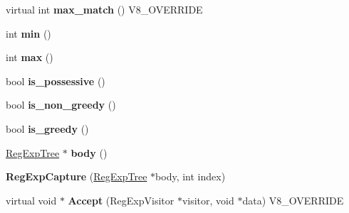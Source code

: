 \begin{DoxyCompactItemize}
\item 
\hypertarget{classv8_1_1internal_1_1_v8___f_i_n_a_l_a0b9dd74bfd4f1172c26a072c44da8669}{}virtual int {\bfseries max\+\_\+match} () V8\+\_\+\+O\+V\+E\+R\+R\+I\+D\+E\label{classv8_1_1internal_1_1_v8___f_i_n_a_l_a0b9dd74bfd4f1172c26a072c44da8669}

\item 
\hypertarget{classv8_1_1internal_1_1_v8___f_i_n_a_l_a0ab74d3455082382f74ba90748665c4e}{}int {\bfseries min} ()\label{classv8_1_1internal_1_1_v8___f_i_n_a_l_a0ab74d3455082382f74ba90748665c4e}

\item 
\hypertarget{classv8_1_1internal_1_1_v8___f_i_n_a_l_a4857f0d67e86b14b682f922d6f4e18ec}{}int {\bfseries max} ()\label{classv8_1_1internal_1_1_v8___f_i_n_a_l_a4857f0d67e86b14b682f922d6f4e18ec}

\item 
\hypertarget{classv8_1_1internal_1_1_v8___f_i_n_a_l_aebbc42ede6b725fac1abfa935bf2c0ea}{}bool {\bfseries is\+\_\+possessive} ()\label{classv8_1_1internal_1_1_v8___f_i_n_a_l_aebbc42ede6b725fac1abfa935bf2c0ea}

\item 
\hypertarget{classv8_1_1internal_1_1_v8___f_i_n_a_l_a8ec094520b125f92302fb21ad8aee140}{}bool {\bfseries is\+\_\+non\+\_\+greedy} ()\label{classv8_1_1internal_1_1_v8___f_i_n_a_l_a8ec094520b125f92302fb21ad8aee140}

\item 
\hypertarget{classv8_1_1internal_1_1_v8___f_i_n_a_l_a640b16085bc62fa0d8dacb82e57f98f2}{}bool {\bfseries is\+\_\+greedy} ()\label{classv8_1_1internal_1_1_v8___f_i_n_a_l_a640b16085bc62fa0d8dacb82e57f98f2}

\item 
\hypertarget{classv8_1_1internal_1_1_v8___f_i_n_a_l_a7d68da380b730fcd95eb41b943743a8b}{}\hyperlink{classv8_1_1internal_1_1_reg_exp_tree}{Reg\+Exp\+Tree} $\ast$ {\bfseries body} ()\label{classv8_1_1internal_1_1_v8___f_i_n_a_l_a7d68da380b730fcd95eb41b943743a8b}

\item 
\hypertarget{classv8_1_1internal_1_1_v8___f_i_n_a_l_ab2fb1b4a9f5b04bc1ee19e349d59f781}{}{\bfseries Reg\+Exp\+Capture} (\hyperlink{classv8_1_1internal_1_1_reg_exp_tree}{Reg\+Exp\+Tree} $\ast$body, int index)\label{classv8_1_1internal_1_1_v8___f_i_n_a_l_ab2fb1b4a9f5b04bc1ee19e349d59f781}

\item 
\hypertarget{classv8_1_1internal_1_1_v8___f_i_n_a_l_a5a421cb811caf33f244ce08fe3e5ac14}{}virtual void $\ast$ {\bfseries Accept} (Reg\+Exp\+Visitor $\ast$visitor, void $\ast$data) V8\+\_\+\+O\+V\+E\+R\+R\+I\+D\+E\label{classv8_1_1internal_1_1_v8___f_i_n_a_l_a5a421cb811caf33f244ce08fe3e5ac14}


\end{DoxyCompactItemize}
